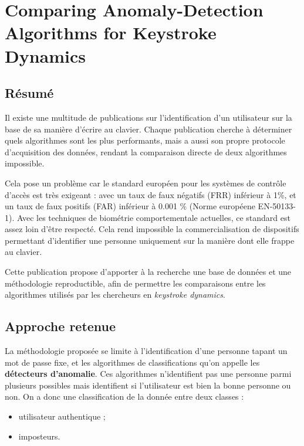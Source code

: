 \section{Comparing Anomaly-Detection Algorithms for Keystroke Dynamics\cite{killourhy2009}}


\subsection{Résumé}
Il existe une multitude de publications sur l'identification d'un utilisateur sur la base de sa manière d'écrire au clavier. Chaque publication cherche à déterminer quels algorithmes sont les plus performants, mais a aussi son propre protocole d'acquisition des données, rendant la comparaison directe de deux algorithmes impossible.

Cela pose un problème car le standard européen pour les systèmes de contrôle d'accès est très exigeant : avec un taux de faux négatifs (FRR) inférieur à 1\%, et un taux de faux positifs (FAR) inférieur à 0.001 \% (Norme européene \no EN-50133-1). Avec les techniques de biométrie comportementale actuelles, ce standard est assez loin d'être respecté. Cela rend impossible la commercialisation de dispositifs permettant d'identifier une personne uniquement sur la manière dont elle frappe au clavier.

Cette publication propose d'apporter à la recherche une base de données et une méthodologie reproductible, afin de permettre les comparaisons entre les algorithmes utilisés par les chercheurs en \textit{keystroke dynamics}.

\subsection{Approche retenue}
La méthodologie proposée se limite à l'identification d'une personne tapant un mot de passe fixe, et les algorithmes de classifications qu'on appelle les \textbf{détecteurs d'anomalie}. Ces algorithmes n'identifient pas une personne parmi plusieurs possibles mais identifient si l'utilisateur est bien la bonne personne ou non. On a donc une classification de la donnée entre deux classes :

	\begin{itemize}
		\item utilisateur authentique ;
		\item imposteurs.
	\end{itemize}


